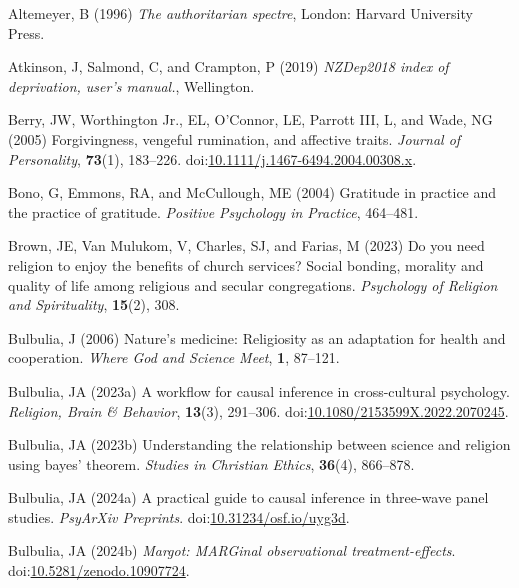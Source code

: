 \documentclass[
  single column]{article}
\newlength{\cslhangindent}
\newenvironment{CSLReferences}[2] %
 {\begin{list}{}{%
  \setlength{\itemindent}{0pt}
  \setlength{\leftmargin}{0pt}
  \setlength{\parsep}{0pt}
  \ifodd #1
   \setlength{\leftmargin}{\cslhangindent}
   \setlength{\itemindent}{-1\cslhangindent}
  \fi
  \setlength{\itemsep}{#2\baselineskip}}}
 {\end{list}}
\begin{document}
\label{refs}
\begin{CSLReferences}{1}{0}
Altemeyer, B (1996) \emph{The authoritarian spectre}, London: Harvard
University Press.

Atkinson, J, Salmond, C, and Crampton, P (2019) \emph{NZDep2018 index of
deprivation, user{'}s manual.}, Wellington.

Berry, JW, Worthington Jr., EL, O'Connor, LE, Parrott III, L, and Wade,
NG (2005) Forgivingness, vengeful rumination, and affective traits.
\emph{Journal of Personality}, \textbf{73}(1), 183--226.
doi:\href{https://doi.org/10.1111/j.1467-6494.2004.00308.x}{10.1111/j.1467-6494.2004.00308.x}.

Bono, G, Emmons, RA, and McCullough, ME (2004) Gratitude in practice and
the practice of gratitude. \emph{Positive Psychology in Practice},
464--481.

Brown, JE, Van Mulukom, V, Charles, SJ, and Farias, M (2023) Do you need
religion to enjoy the benefits of church services? Social bonding,
morality and quality of life among religious and secular congregations.
\emph{Psychology of Religion and Spirituality}, \textbf{15}(2), 308.

Bulbulia, J (2006) Nature's medicine: Religiosity as an adaptation for
health and cooperation. \emph{Where God and Science Meet}, \textbf{1},
87--121.

Bulbulia, JA (2023a) A workflow for causal inference in cross-cultural
psychology. \emph{Religion, Brain \& Behavior}, \textbf{13}(3),
291--306.
doi:\href{https://doi.org/10.1080/2153599X.2022.2070245}{10.1080/2153599X.2022.2070245}.

Bulbulia, JA (2023b) Understanding the relationship between science and
religion using bayes' theorem. \emph{Studies in Christian Ethics},
\textbf{36}(4), 866--878.

Bulbulia, JA (2024a) A practical guide to causal inference in three-wave
panel studies. \emph{PsyArXiv Preprints}.
doi:\href{https://doi.org/10.31234/osf.io/uyg3d}{10.31234/osf.io/uyg3d}.

Bulbulia, JA (2024b) \emph{Margot: MARGinal observational
treatment-effects}.
doi:\href{https://doi.org/10.5281/zenodo.10907724}{10.5281/zenodo.10907724}.


\end{CSLReferences}
\end{document}
